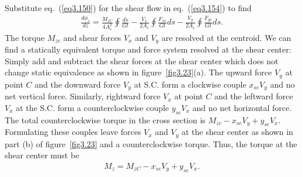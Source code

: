 \documentclass{AeroStructure-ERJohnson}
\begin{document}
Substitute eq.~(\ref{eq3.150}) for the shear flow in eq.~(\ref{eq3.154}) to find
\begin{align}\label{eq3.155}
\frac{d \phi_{z}}{d z}=\frac{M_{z C}}{4 A_{c}^{2}} \oint \frac{d s}{G t}-\frac{V_{x}}{2 A_{c}} \oint \frac{F_{x c}}{G t} d s-\frac{V_{y}}{2 A_{c}} \oint \frac{F_{y c}}{G t} d s.
\end{align}
\noindent The torque $M_{zc}$ and shear forces $V_x$ and $V_y$ are resolved at the centroid. We can find a statically equivalent torque and force system resolved at the shear center: Simply add and subtract the shear forces at the shear center which does not change static equivalence as shown in figure~\ref{fig3.23}(a). The upward force $V_y$ at point $C$ and the downward force $V_y$ at S.C. form a clockwise couple $x_{sc} V_{y}$ and no net vertical force. Similarly, rightward force $V_x$ at point $C$ and the leftward force $V_x$ at the S.C. form a counterclockwise couple $y_{sc} V_{x}$ and no net horizontal force. The total counterclockwise torque in the cross section is $M_{z c}-x_{s c} V_{y}+y_{s c} V_{x}$. Formulating these couples leave forces $V_x$ and $V_y$ at the shear center as shown in part (b) of figure~\ref{fig3.23} and a counterclockwise torque. Thus, the torque at the shear center must be
\begin{align}\label{eq3.156}
M_{z}=M_{z C}-x_{s c} V_{y}+y_{s c} V_{x}.
\end{align}

{\def\thefigure{3.23}
}
\end{document}
